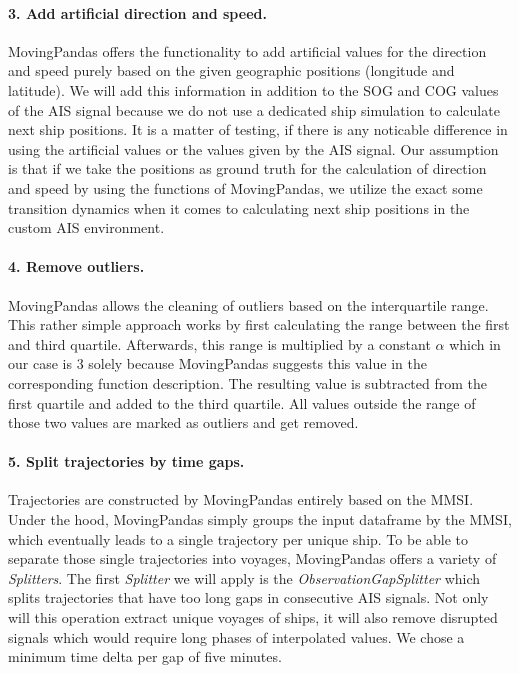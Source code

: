 \paragraph{3. Add artificial direction and speed.}
MovingPandas offers the functionality to add artificial values for the direction and speed purely based on the given geographic positions (longitude and latitude). We will add this information in addition to the SOG and COG values of the AIS signal because we do not use a dedicated ship simulation to calculate next ship positions. It is a matter of testing, if there is any noticable difference in using the artificial values or the values given by the AIS signal. Our assumption is that if we take the positions as ground truth for the calculation of direction and speed by using the functions of MovingPandas, we utilize the exact some transition dynamics when it comes to calculating next ship positions in the custom AIS environment.

\paragraph{4. Remove outliers.}
MovingPandas allows the cleaning of outliers based on the interquartile range. This rather simple approach works by first calculating the range between the first and third quartile. Afterwards, this range is multiplied by a constant $\alpha$ which in our case is $3$ solely because MovingPandas suggests this value in the corresponding function description. The resulting value is subtracted from the first quartile and added to the third quartile. All values outside the range of those two values are marked as outliers and get removed.

\paragraph{5. Split trajectories by time gaps.}
Trajectories are constructed by MovingPandas entirely based on the MMSI. Under the hood, MovingPandas simply groups the input dataframe by the MMSI, which eventually leads to a single trajectory per unique ship. To be able to separate those single trajectories into voyages, MovingPandas offers a variety of \textit{Splitters}. The first \textit{Splitter} we will apply is the \textit{ObservationGapSplitter} which splits trajectories that have too long gaps in consecutive AIS signals. Not only will this operation extract unique voyages of ships, it will also remove disrupted signals which would require long phases of interpolated values.
We chose a minimum time delta per gap of five minutes.

